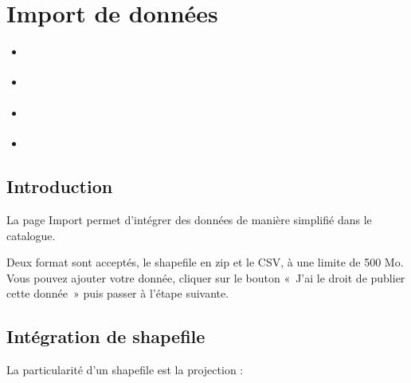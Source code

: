 \documentclass[letterpaper,10pt,french]{sphinxmanual}
\let\sphinxpxdimen\pdfpxdimen\else\newdimen\sphinxpxdimen
\begin{document}
\section{Import de données}
\label{\detokenize{doc_user/import:import-de-donnees}}\label{\detokenize{doc_user/import::doc}}
\begin{sphinxShadowBox}
\begin{itemize}
\item {} 
\sphinxAtStartPar
{}\label{\detokenize{doc_user/import:id1}}{\hyperref[\detokenize{doc_user/import:introduction}]{}}

\item {} 
\sphinxAtStartPar
{}\label{\detokenize{doc_user/import:id2}}{\hyperref[\detokenize{doc_user/import:integration-de-shapefile}]{}}

\item {} 
\sphinxAtStartPar
{}\label{\detokenize{doc_user/import:id3}}{\hyperref[\detokenize{doc_user/import:integration-de-csv}]{}}

\item {} 
\sphinxAtStartPar
{}\label{\detokenize{doc_user/import:id4}}{\hyperref[\detokenize{doc_user/import:processus-d-integration}]{}}

\end{itemize}
\end{sphinxShadowBox}


\subsection{Introduction}
\label{\detokenize{doc_user/import:introduction}}
\sphinxAtStartPar
La page Import permet d’intégrer des données de manière simplifié dans le catalogue.

\noindent{\hspace*{\fill}\sphinxincludegraphics[width=600\sphinxpxdimen]{{import}.png}\hspace*{\fill}}

\sphinxAtStartPar
Deux format sont acceptés, le shapefile en zip et le CSV, à une limite de 500 Mo. Vous pouvez ajouter votre donnée, cliquer sur le bouton « J’ai le droit de publier cette donnée »
puis passer à l’étape suivante.


\subsection{Intégration de shapefile}
\label{\detokenize{doc_user/import:integration-de-shapefile}}
\sphinxAtStartPar
La particularité d’un shapefile est la projection :
\end{document}
